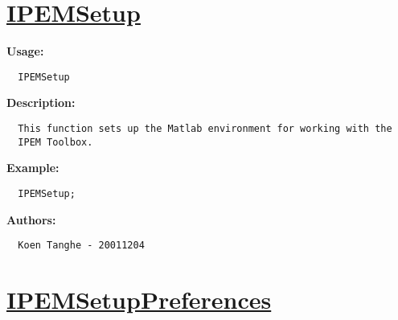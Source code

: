 \newpage
\section*{\hyperlink{Concepts:IPEMSetup}{IPEMSetup}}
\hypertarget{FuncRef:IPEMSetup}{}

\textbf{Usage:}
\begin{verbatim}  IPEMSetup

\end{verbatim}
\textbf{Description:}
\begin{verbatim}  This function sets up the Matlab environment for working with the
  IPEM Toolbox.

\end{verbatim}
\textbf{Example:}
\begin{verbatim}  IPEMSetup;

\end{verbatim}
\textbf{Authors:}
\begin{verbatim}  Koen Tanghe - 20011204
\end{verbatim}


\newpage
\section*{\hyperlink{Concepts:IPEMSetupPreferences}{IPEMSetupPreferences}}
\hypertarget{FuncRef:IPEMSetupPreferences}{}

